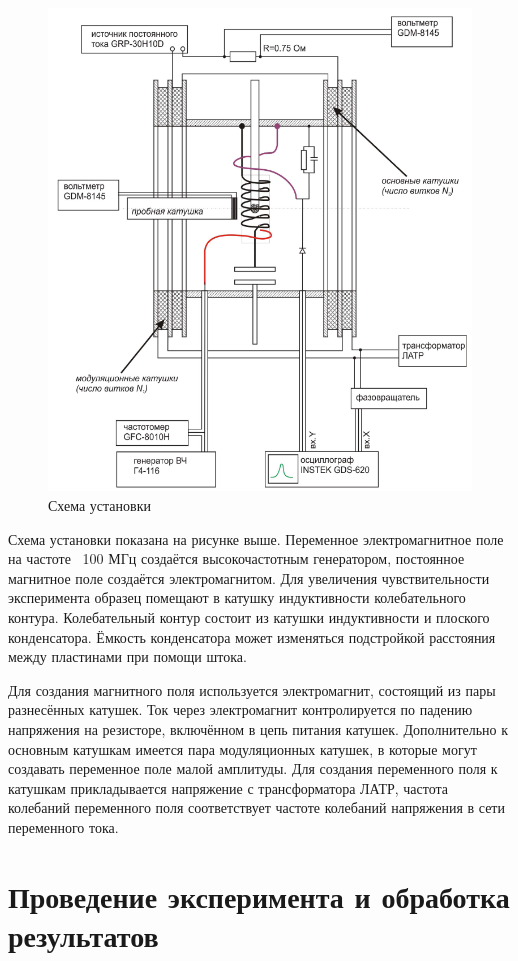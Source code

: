 \documentclass[14pt, a4paper]{report}
\begin{document}
\begin{figure}[H]
\centering
\includegraphics[width=.8\linewidth]{../images/5101-3}
\caption{Схема установки}
\end{figure}

Схема установки показана на рисунке выше. Переменное электромагнитное поле на частоте ~100 МГц создаётся высокочастотным генератором, постоянное магнитное поле создаётся электромагнитом. Для увеличения чувствительности эксперимента образец помещают в катушку индуктивности колебательного контура. Колебательный контур состоит из катушки индуктивности и плоского конденсатора. Ёмкость конденсатора может изменяться подстройкой расстояния между пластинами при помощи штока.

Для создания магнитного поля используется электромагнит, состоящий из пары разнесённых катушек. Ток через электромагнит контролируется по падению напряжения на резисторе, включённом в цепь питания катушек. Дополнительно к основным катушкам имеется пара модуляционных катушек, в которые могут создавать переменное поле малой амплитуды. Для создания переменного поля к катушкам прикладывается напряжение с трансформатора ЛАТР, частота колебаний переменного поля соответствует частоте колебаний напряжения в сети переменного тока.

\section{Проведение эксперимента и обработка результатов}
\end{document}
